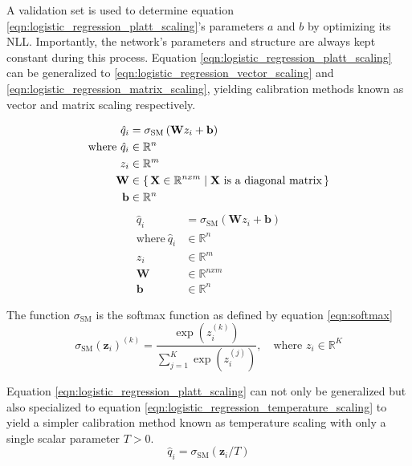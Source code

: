 A validation set is used to determine equation \ref{eqn:logistic_regression_platt_scaling}'s parameters $a$ and $b$ by optimizing its NLL. Importantly, the network's parameters and structure are always kept constant during this process. Equation \ref{eqn:logistic_regression_platt_scaling} can be generalized to \ref{eqn:logistic_regression_vector_scaling} and \ref{eqn:logistic_regression_matrix_scaling}, yielding calibration methods known as vector and matrix scaling respectively.

\begin{align}
\label{eqn:logistic_regression_vector_scaling}
\hat{q}_{i} &= \sigma_{\mathrm{SM}}\left(\mathbf{W} z_{i} + \mathbf{b}\right) \\ \nonumber
\text{where}~\hat{q}_{i} &\in \mathbb{R}^{n} \\ \nonumber
z_{i} &\in \mathbb{R}^{m} \\ \nonumber
\mathbf{W} &\in \{\, \mathbf{X} \in \mathbb{R}^{nxm} \mid \text{$\mathbf{X}$ is a diagonal matrix} \,\} \\ \nonumber
\mathbf{b} &\in \mathbb{R}^{n}
\end{align}
\begin{align}
\label{eqn:logistic_regression_matrix_scaling}
\hat{q}_{i} &= \sigma_{\mathrm{SM}}\left(\mathbf{W} z_{i} + \mathbf{b}\right) \\ \nonumber
\text{where}~\hat{q}_{i} &\in \mathbb{R}^{n} \\ \nonumber
z_{i} &\in \mathbb{R}^{m} \\ \nonumber
\mathbf{W} &\in \mathbb{R}^{nxm} \\ \nonumber
\mathbf{b} &\in \mathbb{R}^{n}
\end{align}

The function $\sigma_{\mathrm{SM}}$ is the softmax function as defined by equation \ref{eqn:softmax}
\begin{equation}
\label{eqn:softmax}
\sigma_{\mathrm{SM}}\left(\mathbf{z}_{i}\right)^{(k)}=\frac{\exp \left(z_{i}^{(k)}\right)}{\sum_{j=1}^{K} \exp \left(z_{i}^{(j)}\right)}, \quad \text{where } z_{i} \in \mathbb{R}^{K}
\end{equation}

Equation \ref{eqn:logistic_regression_platt_scaling} can not only be generalized but also specialized to equation \ref{eqn:logistic_regression_temperature_scaling} to yield a simpler calibration method known as temperature scaling with only a single scalar parameter $T>0$.
\begin{equation}
\label{eqn:logistic_regression_temperature_scaling}
\hat{q}_{i}=\sigma_{\mathrm{SM}}\left(\mathbf{z}_{i} / T\right)
\end{equation}

